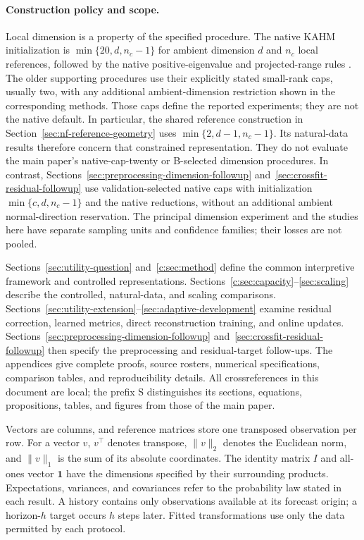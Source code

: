 \documentclass[10pt]{article}
\begin{document}
\paragraph{Construction policy and scope.}
Local dimension is a property of the specified procedure. The native
KAHM initialization is $\min\{20,d,n_c-1\}$ for ambient dimension $d$
and $n_c$ local references, followed by the native positive-eigenvalue
and projected-range rules \citep[Appendix B]{Kumar2025Collaborative}.
The older supporting procedures use their explicitly stated small-rank
caps, usually two, with any additional ambient-dimension restriction
shown in the corresponding methods. Those caps define the reported
experiments; they are not the native default. In particular,
the shared reference construction in Section~\ref{sec:nf-reference-geometry}
uses $\min\{2,d-1,n_c-1\}$. Its natural-data results therefore concern
that constrained representation. They do not evaluate the main paper's
native-cap-twenty or B-selected dimension procedures. In contrast,
Sections~\ref{sec:preprocessing-dimension-followup}
and~\ref{sec:crossfit-residual-followup} use validation-selected native
caps with initialization $\min\{c,d,n_c-1\}$ and the native reductions,
without an additional ambient normal-direction reservation. The
principal dimension experiment and the studies here have separate
sampling units and confidence families; their losses are not pooled.

Sections~\ref{sec:utility-question} and~\ref{c:sec:method} define the common
interpretive framework and controlled representations.
Sections~\ref{c:sec:capacity}--\ref{sec:scaling} describe the controlled,
natural-data, and scaling comparisons.
Sections~\ref{sec:utility-extension}--\ref{sec:adaptive-development}
examine residual correction, learned metrics, direct reconstruction
training, and online updates.
Sections~\ref{sec:preprocessing-dimension-followup}
and~\ref{sec:crossfit-residual-followup} then specify the preprocessing
and residual-target follow-ups. The appendices give complete proofs,
source rosters, numerical specifications, comparison tables, and
reproducibility details. All crossreferences in this document are local;
the prefix S distinguishes its sections, equations, propositions, tables,
and figures from those of the main paper.

Vectors are columns, and reference matrices store one transposed
observation per row. For a vector $v$, $v^\top$ denotes transpose,
$\|v\|_2$ denotes the Euclidean norm, and $\|v\|_1$ is the sum of its
absolute coordinates. The identity matrix $I$ and all-ones vector
$\mathbf1$ have the dimensions specified by their surrounding products.
Expectations, variances, and covariances refer to the probability law
stated in each result. A history contains only observations available at
its forecast origin; a horizon-$h$ target occurs $h$ steps later.
Fitted transformations use only the data permitted by each protocol.
\end{document}

